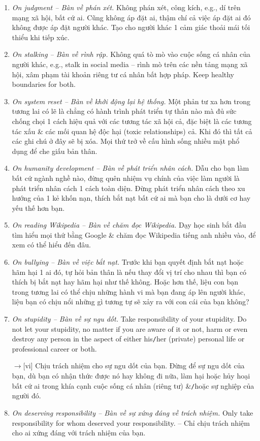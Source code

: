 \documentclass[12pt,oneside]{book}
\begin{document}
\begin{enumerate}
	\item {\it On judgment -- Bàn về phán xét.} Không phán xét, công kích, e.g., dí trên mạng xã hội, bất cứ ai. Cũng không áp đặt ai, thậm chí cả việc áp đặt ai đó không được áp đặt người khác. Tạo cho người khác 1 cảm giác thoải mái tối thiểu khi tiếp xúc.
	\item {\it On stalking -- Bàn về rình rập.} Không quá tò mò vào cuộc sống cá nhân của người khác, e.g., stalk in social media -- rình mò trên các nền tảng mạng xã hội, xâm phạm tài khoản  riêng tư cá nhân bất hợp pháp. Keep healthy boundaries for both.
	\item {\it On system reset -- Bàn về khởi động lại hệ thống.} Một phản tư xa hơn trong tương lai có lẽ là chẳng có hành trình phát triển tự thân nào mà đủ sức chống chọi 1 cách hiệu quả với các tương tác xã hội cả, đặc biệt là các tương tác xấu \& các mối quan hệ độc hại (toxic relationships) cả. Khi đó thì tất cả các ghi chú ở đây sẽ bị xóa. Mọi thứ trở về cấu hình sống nhiều mặt phổ dụng để che giấu bản thân.	
	\item {\it On humanity development -- Bàn về phát triển nhân cách.} Dẫu cho bạn làm bất cứ ngành nghề nào, đừng quên nhiệm vụ chính của việc làm người là phát triển nhân cách 1 cách toàn diện. Đừng phát triển nhân cách theo xu hướng của 1 kẻ khốn nạn, thích bắt nạt bất cứ ai mà bạn cho là dưới cơ hay yếu thế hơn bạn.
	\item {\it On reading Wikipedia -- Bàn về chăm đọc Wikipedia.} Dạy học sinh bắt đầu tìm hiểu mọi thứ bằng Google \& chăm đọc Wikipedia tiếng anh nhiều vào, để xem có thể hiểu đến đâu.
	\item {\it On bullying -- Bàn về việc bắt nạt.} Trước khi bạn quyết định bắt nạt hoặc hãm hại 1 ai đó, tự hỏi bản thân là nếu thay đổi vị trí cho nhau thì bạn có thích bị bắt nạt hay hãm hại như thế không. Hoặc hơn thế, liệu con bạn trong tương lai có thể chịu những hành vi mà bạn đang áp lên người khác, liệu bạn có chịu nổi những gì tương tự sẽ xảy ra với con cái của bạn không?
	\item {\it On stupidity -- Bàn về sự ngu dốt.} Take responsibility of your stupidity. Do not let your stupidity, no matter if you are aware of it or not, harm or even destroy any person in the aspect of either his{\tt/}her (private) personal life or professional career or both.
	
	{\sf[en]$\to$[vi]} Chịu trách nhiệm cho sự ngu dốt của bạn. Đừng để sự ngu dốt của bạn, dù bạn có nhận thức được nó hay không đi nữa, làm hại hoặc hủy hoại bất cứ ai trong khía cạnh cuộc sống cá nhân (riêng tư) \&{\tt/}hoặc sự nghiệp của người đó.
	\item {\it On deserving responsibility -- Bàn về sự xứng đáng về trách nhiệm.} Only take responsibility for whom deserved your responsibility. -- Chỉ chịu trách nhiệm cho ai xứng đáng với trách nhiệm của bạn.
\end{enumerate}
\end{document}
